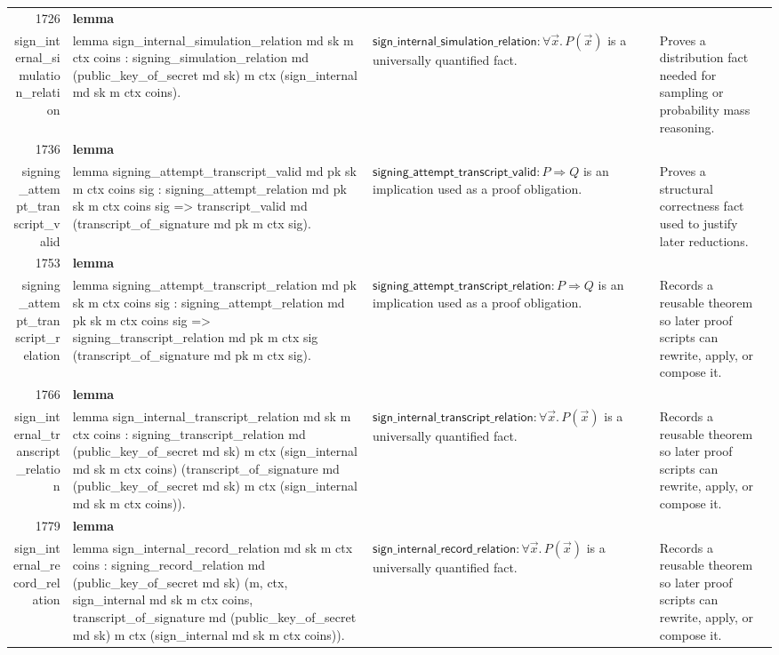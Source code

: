 \documentclass[10pt]{article}
\newcommand{\ec}[1]{\begingroup\ttfamily\scriptsize #1\endgroup}
\begin{document}
\begin{longtable}{r L{0.17\textwidth} L{0.26\textwidth} L{0.27\textwidth} L{0.20\textwidth}}
1726 & \textbf{lemma}\\\ec{sign\_internal\_simulation\_relation} & \ec{lemma sign\_internal\_simulation\_relation md sk m ctx coins : signing\_simulation\_relation md (public\_key\_of\_secret md sk) m ctx (sign\_internal md sk m ctx coins).} & \(\mathsf{sign\_internal\_simulation\_relation} : \forall \vec{x}.\, P(\vec{x})\) is a universally quantified fact. & Proves a distribution fact needed for sampling or probability mass reasoning. \\
1736 & \textbf{lemma}\\\ec{signing\_attempt\_transcript\_valid} & \ec{lemma signing\_attempt\_transcript\_valid md pk sk m ctx coins sig : signing\_attempt\_relation md pk sk m ctx coins sig => transcript\_valid md (transcript\_of\_signature md pk m ctx sig).} & \(\mathsf{signing\_attempt\_transcript\_valid} : P \Rightarrow Q\) is an implication used as a proof obligation. & Proves a structural correctness fact used to justify later reductions. \\
1753 & \textbf{lemma}\\\ec{signing\_attempt\_transcript\_relation} & \ec{lemma signing\_attempt\_transcript\_relation md pk sk m ctx coins sig : signing\_attempt\_relation md pk sk m ctx coins sig => signing\_transcript\_relation md pk m ctx sig (transcript\_of\_signature md pk m ctx sig).} & \(\mathsf{signing\_attempt\_transcript\_relation} : P \Rightarrow Q\) is an implication used as a proof obligation. & Records a reusable theorem so later proof scripts can rewrite, apply, or compose it. \\
1766 & \textbf{lemma}\\\ec{sign\_internal\_transcript\_relation} & \ec{lemma sign\_internal\_transcript\_relation md sk m ctx coins : signing\_transcript\_relation md (public\_key\_of\_secret md sk) m ctx (sign\_internal md sk m ctx coins) (transcript\_of\_signature md (public\_key\_of\_secret md sk) m ctx (sign\_internal md sk m ctx coins)).} & \(\mathsf{sign\_internal\_transcript\_relation} : \forall \vec{x}.\, P(\vec{x})\) is a universally quantified fact. & Records a reusable theorem so later proof scripts can rewrite, apply, or compose it. \\
1779 & \textbf{lemma}\\\ec{sign\_internal\_record\_relation} & \ec{lemma sign\_internal\_record\_relation md sk m ctx coins : signing\_record\_relation md (public\_key\_of\_secret md sk) (m, ctx, sign\_internal md sk m ctx coins, transcript\_of\_signature md (public\_key\_of\_secret md sk) m ctx (sign\_internal md sk m ctx coins)).} & \(\mathsf{sign\_internal\_record\_relation} : \forall \vec{x}.\, P(\vec{x})\) is a universally quantified fact. & Records a reusable theorem so later proof scripts can rewrite, apply, or compose it. \\

\end{longtable}
\end{document}
